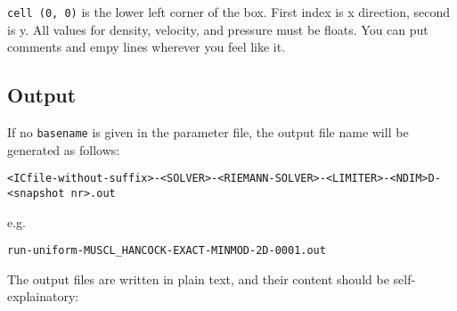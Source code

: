 \texttt{cell\ (0,\ 0)} is the lower left corner of the box. First index is x
direction, second is y. All values for density, velocity, and pressure must be
floats. You can put comments and empy lines wherever you feel like it.











\subsection{Output}




If no \texttt{basename} is given in the parameter file, the output file
name will be generated as follows:

\begin{lstlisting}
<ICfile-without-suffix>-<SOLVER>-<RIEMANN-SOLVER>-<LIMITER>-<NDIM>D-<snapshot nr>.out
\end{lstlisting}

e.g.

\begin{lstlisting}
run-uniform-MUSCL_HANCOCK-EXACT-MINMOD-2D-0001.out
\end{lstlisting}

The output files are written in plain text, and their content should be
self-explainatory:

